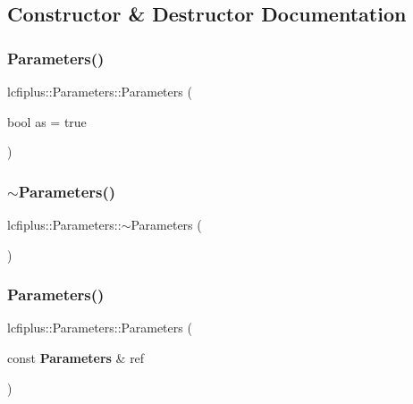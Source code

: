 \subsection{Constructor \& Destructor Documentation}
\mbox{\label{classlcfiplus_1_1Parameters_a6477747e2ec38ec165df21b106b17ed4}} 
\subsubsection{Parameters()\hspace{0.1cm}{\footnotesize\ttfamily [1/2]}}
{\footnotesize\ttfamily lcfiplus\+::\+Parameters\+::\+Parameters (\begin{DoxyParamCaption}\item[{bool}]{as = {\ttfamily true} }\end{DoxyParamCaption})\hspace{0.3cm}{\ttfamily [inline]}}

\mbox{\label{classlcfiplus_1_1Parameters_a05a4af1fa750b3d8ae18d6d56eda7b5e}} 
\subsubsection{$\sim$\+Parameters()}
{\footnotesize\ttfamily lcfiplus\+::\+Parameters\+::$\sim$\+Parameters (\begin{DoxyParamCaption}{ }\end{DoxyParamCaption})\hspace{0.3cm}{\ttfamily [inline]}}

\mbox{\label{classlcfiplus_1_1Parameters_a14987ec824053706cb494a3f4c573587}} 
\subsubsection{Parameters()\hspace{0.1cm}{\footnotesize\ttfamily [2/2]}}
{\footnotesize\ttfamily lcfiplus\+::\+Parameters\+::\+Parameters (\begin{DoxyParamCaption}\item[{const \textbf{ Parameters} \&}]{ref }\end{DoxyParamCaption})\hspace{0.3cm}{\ttfamily [inline]}}



